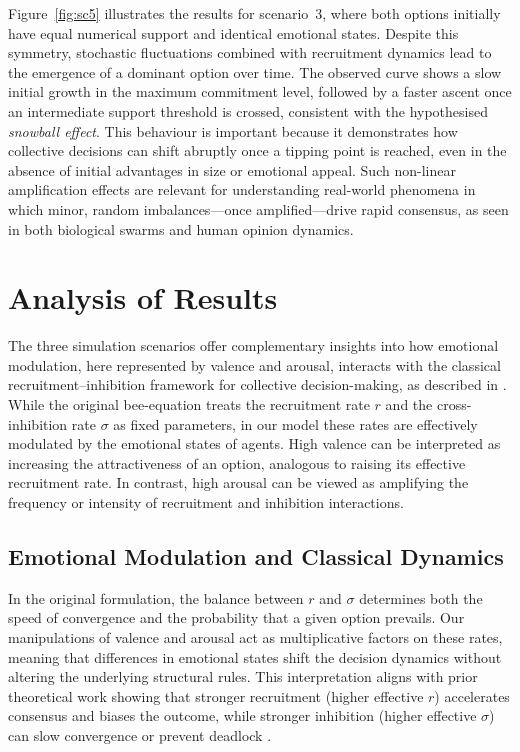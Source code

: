 \documentclass[a4paper,twoside]{article}
\begin{document}
Figure~\ref{fig:sc5} illustrates the results for scenario~3, where both options initially have equal numerical support and identical emotional states. 
Despite this symmetry, stochastic fluctuations combined with recruitment dynamics lead to the emergence of a dominant option over time. 
The observed curve shows a slow initial growth in the maximum commitment level, followed by a faster ascent once an intermediate support threshold is crossed, consistent with the hypothesised \emph{snowball effect}. 
This behaviour is important because it demonstrates how collective decisions can shift abruptly once a tipping point is reached, even in the absence of initial advantages in size or emotional appeal. 
Such non-linear amplification effects are relevant for understanding real-world phenomena in which minor, random imbalances—once amplified—drive rapid consensus, as seen in both biological swarms and human opinion dynamics.


\section{Analysis of Results}
\label{sec:analysis}

The three simulation scenarios offer complementary insights into how emotional modulation, here represented by valence and arousal, interacts with the classical recruitment--inhibition framework for collective decision-making, as described in \cite{pais2013mechanism,Chase25}. 
While the original bee-equation treats the recruitment rate $r$ and the cross-inhibition rate $\sigma$ as fixed parameters, in our model these rates are effectively modulated by the emotional states of agents. 
High valence can be interpreted as increasing the attractiveness of an option, analogous to raising its effective recruitment rate. In contrast, high arousal can be viewed as amplifying the frequency or intensity of recruitment and inhibition interactions. 

\subsection{Emotional Modulation and Classical Dynamics}
In the original formulation, the balance between $r$ and $\sigma$ determines both the speed of convergence and the probability that a given option prevails. 
Our manipulations of valence and arousal act as multiplicative factors on these rates, meaning that differences in emotional states shift the decision dynamics without altering the underlying structural rules. 
This interpretation aligns with prior theoretical work showing that stronger recruitment (higher effective $r$) accelerates consensus and biases the outcome, while stronger inhibition (higher effective $\sigma$) can slow convergence or prevent deadlock \cite{pais2013mechanism}.
\end{document}
